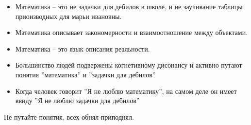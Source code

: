 \begin{itemize}
    \item Математика -- это не задачки для дебилов в школе, и не заучивание таблицы приоизводных для марьи ивановны.
    \item Математика описывает закономерности и взаимоотношение между объектами.
    \item Математика -- это язык описания реальности.
    \item Большинство людей подвержены когнетивному дисонансу и активно путают понятия ''математика'' и ''задачки для дебилов''
    \item Когда человек говорит ''Я не люблю математику'', на самом деле он имеет ввиду ''Я не люблю задачки для дебилов''
\end{itemize}
Не путайте понятия, всех обнял-приподнял.